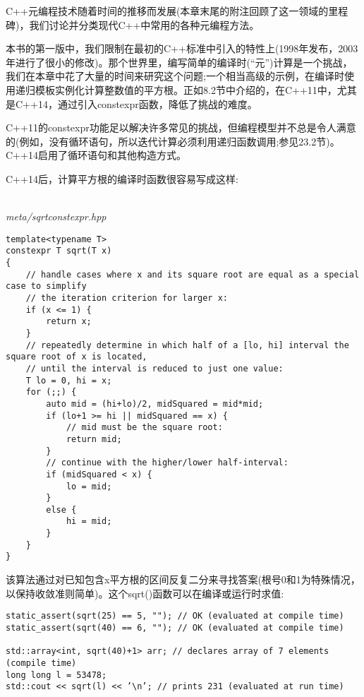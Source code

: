 
C++元编程技术随着时间的推移而发展(本章末尾的附注回顾了这一领域的里程碑)，我们讨论并分类现代C++中常用的各种元编程方法。


本书的第一版中，我们限制在最初的C++标准中引入的特性上(1998年发布，2003年进行了很小的修改)。那个世界里，编写简单的编译时(“元”)计算是一个挑战，我们在本章中花了大量的时间来研究这个问题;一个相当高级的示例，在编译时使用递归模板实例化计算整数值的平方根。正如8.2节中介绍的，在C++11中，尤其是C++14，通过引入constexpr函数，降低了挑战的难度。

\begin{tcolorbox}[colback=webgreen!5!white,colframe=webgreen!75!black]
\hspace*{0.75cm}C++11的constexpr功能足以解决许多常见的挑战，但编程模型并不总是令人满意的(例如，没有循环语句，所以迭代计算必须利用递归函数调用;参见23.2节)。C++14启用了循环语句和其他构造方式。
\end{tcolorbox}

C++14后，计算平方根的编译时函数很容易写成这样:

\hspace*{\fill} \\ %
\noindent
\textit{meta/sqrtconstexpr.hpp}
\begin{lstlisting}[style=styleCXX]
template<typename T>
constexpr T sqrt(T x)
{
	// handle cases where x and its square root are equal as a special case to simplify
	// the iteration criterion for larger x:
	if (x <= 1) {
		return x;
	}
	// repeatedly determine in which half of a [lo, hi] interval the square root of x is located,
	// until the interval is reduced to just one value:
	T lo = 0, hi = x;
	for (;;) {
		auto mid = (hi+lo)/2, midSquared = mid*mid;
		if (lo+1 >= hi || midSquared == x) {
			// mid must be the square root:
			return mid;
		}
		// continue with the higher/lower half-interval:
		if (midSquared < x) {
			lo = mid;
		}
		else {
			hi = mid;
		}
	}
}
\end{lstlisting}

该算法通过对已知包含x平方根的区间反复二分来寻找答案(根号0和1为特殊情况，以保持收敛准则简单)。这个sqrt()函数可以在编译或运行时求值:

\begin{lstlisting}[style=styleCXX]
static_assert(sqrt(25) == 5, ""); // OK (evaluated at compile time)
static_assert(sqrt(40) == 6, ""); // OK (evaluated at compile time)

std::array<int, sqrt(40)+1> arr; // declares array of 7 elements (compile time)
long long l = 53478;
std::cout << sqrt(l) << ’\n’; // prints 231 (evaluated at run time)
\end{lstlisting}

